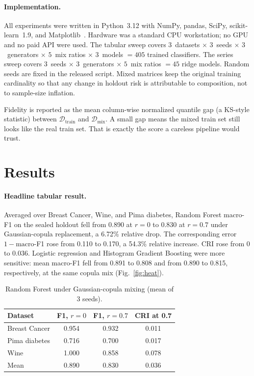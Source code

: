 \documentclass[conference]{IEEEtran}
\begin{document}
\paragraph{Implementation.}
All experiments were written in Python~3.12 with NumPy, pandas, SciPy, scikit-learn~1.9, and Matplotlib~\cite{pedregosa2011sklearn}.
Hardware was a standard CPU workstation; no GPU and no paid API were used.
The tabular sweep covers $3$~datasets $\times$ $3$~seeds $\times$ $3$~generators $\times$ $5$~mix ratios $\times$ $3$~models $= 405$ trained classifiers.
The series sweep covers $3$~seeds $\times$ $3$~generators $\times$ $5$~mix ratios $= 45$ ridge models.
Random seeds are fixed in the released script.
Mixed matrices keep the original training cardinality so that any change in holdout risk is attributable to composition, not to sample-size inflation.

Fidelity is reported as the mean column-wise normalized quantile gap (a KS-style statistic) between $\mathcal{D}_{\mathrm{train}}$ and $\mathcal{D}_{\mathrm{mix}}$.
A small gap means the mixed train set still looks like the real train set.
That is exactly the score a careless pipeline would trust.

\section{Results}
\label{sec:results}
\paragraph{Headline tabular result.}
Averaged over Breast Cancer, Wine, and Pima diabetes, Random Forest macro-F1 on the sealed holdout fell from 0.890 at $r=0$ to 0.830 at $r=0.7$ under Gaussian-copula replacement, a 6.72\% relative drop.
The corresponding error $1-\mathrm{macro}$-F1 rose from 0.110 to 0.170, a 54.3\% relative increase.
CRI rose from 0 to 0.036.
Logistic regression and Histogram Gradient Boosting were more sensitive: mean macro-F1 fell from 0.891 to 0.808 and from 0.890 to 0.815, respectively, at the same copula mix (Fig.~\ref{fig:heat}).

\begin{table}[t]
\centering
\caption{Random Forest under Gaussian-copula mixing (mean of 3 seeds).}
\label{tab:rf}
\begin{tabular}{lccc}
\toprule
Dataset & F1, $r=0$ & F1, $r=0.7$ & CRI at 0.7 \\
\midrule
Breast Cancer & 0.954 & 0.932 & 0.011 \\
Pima diabetes & 0.716 & 0.700 & 0.017 \\
Wine & 1.000 & 0.858 & 0.078 \\
\midrule
Mean & 0.890 & 0.830 & 0.036 \\
\bottomrule
\end{tabular}
\end{table}
\end{document}
